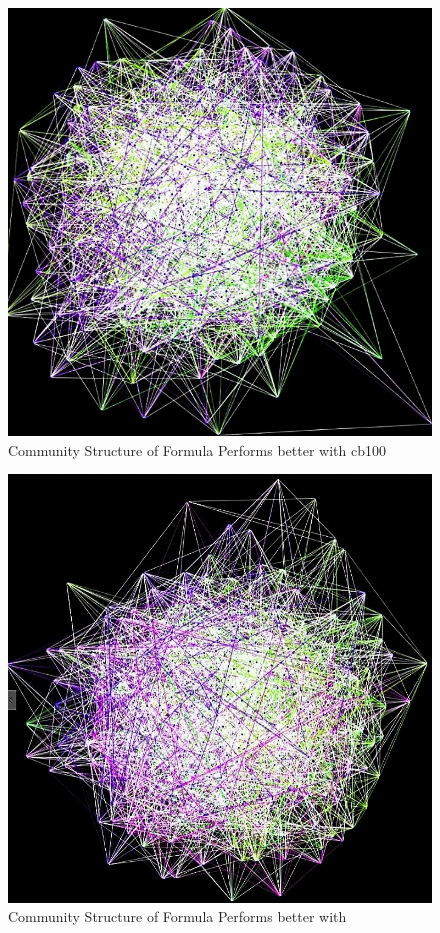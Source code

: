 \begin{figure}
    \centering
    \includegraphics[scale=0.12]{cb100.jpg}
   \caption{Community Structure of Formula Performs better with cb100}
   \label{fig:cb100}
\end{figure}

\begin{figure}
    \centering
    \includegraphics[scale=0.12]{bone.jpg}
   \caption{Community Structure of Formula Performs better with \tool}
   \label{fig:bone}
\end{figure}

